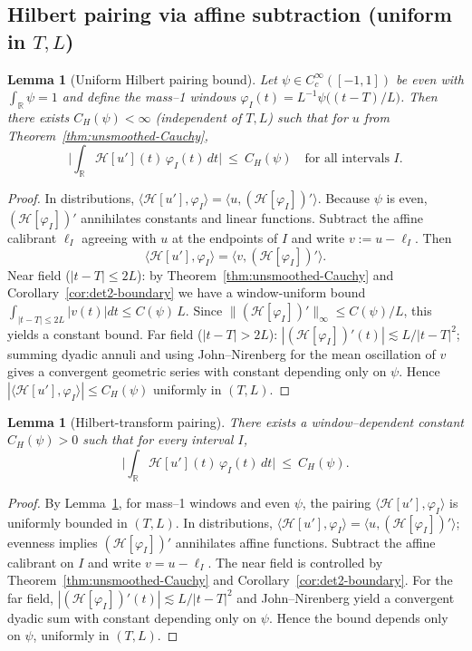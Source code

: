 \documentclass[11pt]{article}
\newtheorem{lemma}[theorem]{Lemma}
\theoremstyle{definition}
\theoremstyle{remark}
\newcommand{\R}{\mathbb{R}}
\begin{document}
\subsection*{Hilbert pairing via affine subtraction (uniform in $T,L$)}
\begin{lemma}[Uniform Hilbert pairing bound]\label{lem:hilbert-H1BMO}
Let $\psi\in C_c^\infty([-1,1])$ be even with $\int_\R\psi=1$ and define the mass--1 windows $\varphi_I(t)=L^{-1}\psi\big((t-T)/L\big)$. Then there exists $C_H(\psi)<\infty$ (independent of $T,L$) such that for $u$ from Theorem~\ref{thm:unsmoothed-Cauchy},
\[
  \Big|\int_\R \mathcal H[u'](t)\,\varphi_I(t)\,dt\Big|\ \le\ C_H(\psi)\quad\text{for all intervals }I.
\]
\end{lemma}
\begin{proof}
In distributions, $\langle \mathcal H[u'],\varphi_I\rangle=\langle u,(\mathcal H[\varphi_I])'\rangle$. Because $\psi$ is even, $(\mathcal H[\varphi_I])'$ annihilates constants and linear functions. Subtract the affine calibrant $\ell_I$ agreeing with $u$ at the endpoints of $I$ and write $v:=u-\ell_I$. Then
\[\langle \mathcal H[u'],\varphi_I\rangle=\langle v,(\mathcal H[\varphi_I])'\rangle.\]
Near field ($|t-T|\le 2L$): by Theorem~\ref{thm:unsmoothed-Cauchy} and Corollary~\ref{cor:det2-boundary} we have a window-uniform bound $\int_{|t-T|\le 2L}|v(t)|dt\le C(\psi)\,L$. Since $\|(\mathcal H[\varphi_I])'\|_{\infty}\le C(\psi)/L$, this yields a constant bound.
Far field ($|t-T|>2L$): $|(\mathcal H[\varphi_I])'(t)|\lesssim L/|t-T|^2$; summing dyadic annuli and using John–Nirenberg for the mean oscillation of $v$ gives a convergent geometric series with constant depending only on $\psi$. Hence $|\langle \mathcal H[u'],\varphi_I\rangle|\le C_H(\psi)$ uniformly in $(T,L)$.
\end{proof}
\begin{lemma}[Hilbert-transform pairing]\label{lem:hilbert-aux}
There exists a window–dependent constant \(C_H(\psi)>0\) such that for every interval \(I\),
\[ \Big|\int_{\R} \mathcal H[u'](t)\,\varphi_I(t)\,dt\Big|\ \le\ C_H(\psi).\]
\end{lemma}
\begin{proof}
By Lemma~\ref{lem:hilbert-H1BMO}, for mass–1 windows and even \(\psi\), the pairing \(\langle \mathcal H[u'],\varphi_I\rangle\) is uniformly bounded in \((T,L)\). In distributions, \(\langle \mathcal H[u'],\varphi_I\rangle=\langle u,(\mathcal H[\varphi_I])'\rangle\); evenness implies \((\mathcal H[\varphi_I])'\) annihilates affine functions. Subtract the affine calibrant on \(I\) and write \(v=u-\ell_I\). The near field is controlled by Theorem~\ref{thm:unsmoothed-Cauchy} and Corollary~\ref{cor:det2-boundary}. For the far field, \(|(\mathcal H[\varphi_I])'(t)|\lesssim L/|t-T|^2\) and John–Nirenberg yield a convergent dyadic sum with constant depending only on \(\psi\). Hence the bound depends only on \(\psi\), uniformly in \((T,L)\).
\end{proof}
\end{document}
